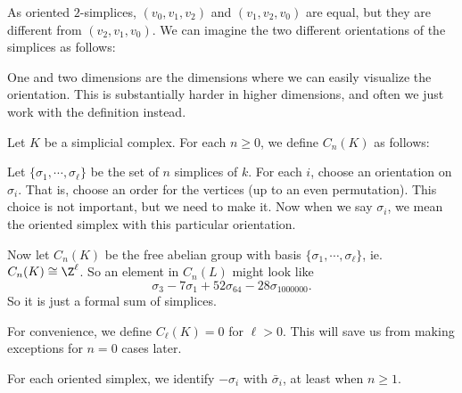\documentclass[a4paper]{article}
\begin{document}
\begin{eg}
  As oriented $2$-simplices, $(v_0, v_1, v_2)$ and $(v_1, v_2, v_0)$ are equal, but they are different from $(v_2, v_1, v_0)$. We can imagine the two different orientations of the simplices as follows:
  \begin{center}
  \end{center}
\end{eg}
One and two dimensions are the dimensions where we can easily visualize the orientation. This is substantially harder in higher dimensions, and often we just work with the definition instead.

\begin{defi}
  Let $K$ be a simplicial complex. For each $n \geq 0$, we define $C_n(K)$ as follows:

  Let $\{\sigma_1, \cdots, \sigma_\ell\}$ be the set of $n$ simplices of $k$. For each $i$, choose an orientation on $\sigma_i$. That is, choose an order for the vertices (up to an even permutation). This choice is not important, but we need to make it. Now when we say $\sigma_i$, we mean the oriented simplex with this particular orientation.

  Now let $C_n(K)$ be the free abelian group with basis $\{\sigma_1, \cdots, \sigma_\ell\}$, ie. $C_n(K) \cong \Z^\ell$. So an element in $C_n(L)$ might look like
  \[
    \sigma_3 - 7 \sigma_1 + 52 \sigma_{64} - 28 \sigma_{1000000}.
  \]
  So it is just a formal sum of simplices.

  For convenience, we define $C_{\ell}(K) = 0$ for $\ell > 0$. This will save us from making exceptions for $n = 0$ cases later.
\end{defi}
For each oriented simplex, we identify $-\sigma_i$ with $\bar{\sigma}_i$, at least when $n \geq 1$.
\end{document}
